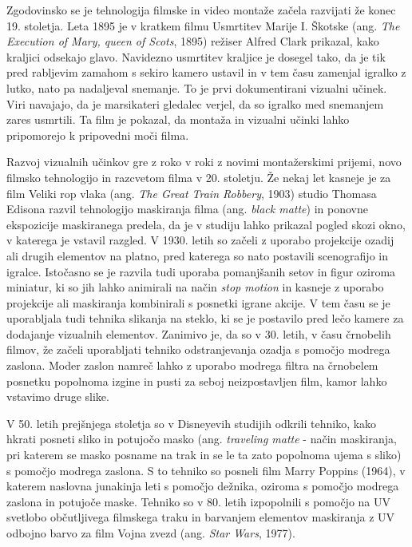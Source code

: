 \documentclass[a4paper, 12pt]{book}
\begin{document}
Zgodovinsko se je tehnologija filmske in video montaže začela razvijati že konec 19. stoletja. 
Leta 1895 je v kratkem filmu Usmrtitev Marije I. Škotske (ang. {\it The Execution of Mary, queen of Scots}, 1895) režiser Alfred Clark prikazal, kako kraljici odsekajo glavo. 
Navidezno usmrtitev kraljice je dosegel tako, da je tik pred rabljevim zamahom s sekiro kamero ustavil in v tem času zamenjal igralko z lutko, nato pa nadaljeval snemanje. 
To je prvi dokumentirani vizualni učinek. 
Viri navajajo, da je marsikateri gledalec verjel, da so igralko med snemanjem zares usmrtili.
Ta film je pokazal, da montaža in vizualni učinki lahko pripomorejo k pripovedni moči filma.

Razvoj vizualnih učinkov gre z roko v roki z novimi montažerskimi prijemi, novo filmsko tehnologijo in razcvetom filma v 20. stoletju. 
Že nekaj let kasneje je za film Veliki rop vlaka (ang. {\it The Great Train Robbery}, 1903) studio Thomasa Edisona razvil tehnologijo maskiranja filma (ang. {\it black matte}) in ponovne ekspozicije maskiranega predela, da je v studiju lahko prikazal pogled skozi okno, v katerega je vstavil razgled. 
V 1930. letih so začeli z uporabo projekcije ozadij ali drugih elementov na platno, pred katerega so nato postavili scenografijo in igralce. 
Istočasno se je razvila tudi uporaba pomanjšanih setov in figur oziroma miniatur, ki so jih lahko animirali na način {\it stop motion} in kasneje z uporabo projekcije ali maskiranja kombinirali s posnetki igrane akcije. 
V tem času se je uporabljala tudi tehnika slikanja na steklo, ki se je postavilo pred lečo kamere za dodajanje vizualnih elementov. 
Zanimivo je, da so v 30. letih, v času črnobelih filmov, že začeli uporabljati tehniko odstranjevanja ozadja s pomočjo modrega zaslona. 
Moder zaslon namreč lahko z uporabo modrega filtra na črnobelem posnetku popolnoma izgine in pusti za seboj neizpostavljen film, kamor lahko vstavimo druge slike. 

V 50. letih prejšnjega stoletja so v Disneyevih studijih odkrili tehniko, kako hkrati posneti sliko in potujočo masko (ang. {\it traveling matte} - način maskiranja, pri katerem se masko posname na trak in se le ta zato popolnoma ujema s sliko) s pomočjo modrega zaslona. 
S to tehniko so posneli film Marry Poppins (1964), v katerem naslovna junakinja leti s pomočjo dežnika, oziroma s pomočjo modrega zaslona in potujoče maske\cite{vesHandbook}.
Tehniko so v 80. letih izpopolnili s pomočjo na UV svetlobo občutljivega filmskega traku in barvanjem elementov maskiranja z UV odbojno barvo za film Vojna zvezd (ang. {\it Star Wars}, 1977). 
\end{document}
